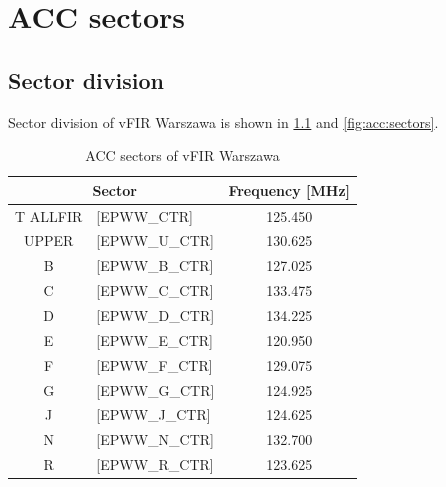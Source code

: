 
\chapter{ACC sectors}
\label{chap:acc:sectors}

\section{Sector division}

Sector division of vFIR Warszawa is shown in \cref{tab:acc:sectors} and \cref{fig:acc:sectors}.

\begin{table}[htbp]
	\centering
	\begin{tabular}{|c l|c|}
		\hline
		\multicolumn{2}{|c|}{\cellcolor{vred}\color{white}\textbf{Sector}} & \cellcolor{vred}\color{white}\textbf{Frequency} [MHz]           \\\hline
		\color{Orange}T ALLFIR                                             & \tiny [EPWW\_CTR]                                     & 125.450 \\\hline
		\color{OliveGreen}UPPER                                            & \tiny [EPWW\_U\_CTR]                                  & 130.625 \\\hline
		\color{ProcessBlue}B                                               & \tiny [EPWW\_B\_CTR]                                  & 127.025 \\\hline
		\color{Orange}C                                                    & \tiny [EPWW\_C\_CTR]                                  & 133.475 \\\hline
		\color{Orange}D                                                    & \tiny [EPWW\_D\_CTR]                                  & 134.225 \\\hline
		\color{MidnightBlue}E                                              & \tiny [EPWW\_E\_CTR]                                  & 120.950 \\\hline
		\color{ProcessBlue}F                                               & \tiny [EPWW\_F\_CTR]                                  & 129.075 \\\hline
		\color{ProcessBlue}G                                               & \tiny [EPWW\_G\_CTR]                                  & 124.925 \\\hline
		\color{vred}J                                                      & \tiny [EPWW\_J\_CTR]                                  & 124.625 \\\hline
		\color{MidnightBlue}N                                              & \tiny [EPWW\_N\_CTR]                                  & 132.700 \\\hline
		\color{vred}R                                                      & \tiny [EPWW\_R\_CTR]                                  & 123.625 \\\hline
	\end{tabular}
	\caption{ACC sectors of vFIR Warszawa}
	\label{tab:acc:sectors}
\end{table}

